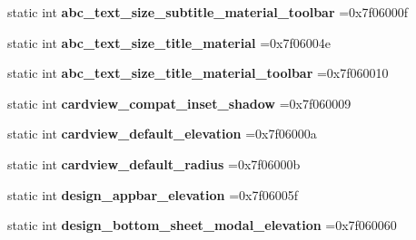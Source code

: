 \begin{DoxyCompactItemize}
\item 
\mbox{\label{classandroid_1_1support_1_1v4_1_1R_1_1dimen_a95f83c3e2d256b57b8ce621df9d88cbe}} 
static int {\bfseries abc\+\_\+text\+\_\+size\+\_\+subtitle\+\_\+material\+\_\+toolbar} =0x7f06000f
\item 
\mbox{\label{classandroid_1_1support_1_1v4_1_1R_1_1dimen_a1e7ee0cb4470525bc9ffa66649697c3f}} 
static int {\bfseries abc\+\_\+text\+\_\+size\+\_\+title\+\_\+material} =0x7f06004e
\item 
\mbox{\label{classandroid_1_1support_1_1v4_1_1R_1_1dimen_ab48d8ccbd1334f77baf8a7a1d7fb2641}} 
static int {\bfseries abc\+\_\+text\+\_\+size\+\_\+title\+\_\+material\+\_\+toolbar} =0x7f060010
\item 
\mbox{\label{classandroid_1_1support_1_1v4_1_1R_1_1dimen_a42b36d16e76a45a3ca767100cd5b000f}} 
static int {\bfseries cardview\+\_\+compat\+\_\+inset\+\_\+shadow} =0x7f060009
\item 
\mbox{\label{classandroid_1_1support_1_1v4_1_1R_1_1dimen_af2f140c4766981e52a422227a6e93953}} 
static int {\bfseries cardview\+\_\+default\+\_\+elevation} =0x7f06000a
\item 
\mbox{\label{classandroid_1_1support_1_1v4_1_1R_1_1dimen_acb471ebc2601bdc0e13b891bd48b8732}} 
static int {\bfseries cardview\+\_\+default\+\_\+radius} =0x7f06000b
\item 
\mbox{\label{classandroid_1_1support_1_1v4_1_1R_1_1dimen_a4c2e80ac421622e1bc2ed05dcd69ab26}} 
static int {\bfseries design\+\_\+appbar\+\_\+elevation} =0x7f06005f
\item 
\mbox{\label{classandroid_1_1support_1_1v4_1_1R_1_1dimen_ac3aea5fb832baa5635011faf52754426}} 
static int {\bfseries design\+\_\+bottom\+\_\+sheet\+\_\+modal\+\_\+elevation} =0x7f060060
\item 
\mbox{\label{classandroid_1_1support_1_1v4_1_1R_1_1dimen_ac88b8edf4987badc017da375f9cb06bc}} 

\end{DoxyCompactItemize}
